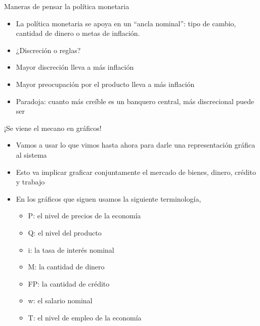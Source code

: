 \documentclass{beamer}
\begin{document}
\begin{frame}{Maneras de pensar la política monetaria}
    \begin{itemize}
        \item La política monetaria se apoya en un “ancla nominal”: tipo de cambio, cantidad de dinero o metas de inflación.
        \item ¿Discreción o reglas?
        \item Mayor discreción lleva a más inflación
        \item Mayor preocupación por el producto lleva a más inflación
            \item Paradoja: cuanto más creíble es un banquero central, más discrecional puede ser
        \end{itemize}
\end{frame}
\begin{frame}{¡Se viene el mecano en gráficos!}

\begin{itemize}
    \item Vamos a usar lo que vimos hasta ahora para darle una representación gráfica al sistema 
    \item Esto va implicar graficar conjuntamente el mercado de bienes, dinero, crédito y trabajo
    \item En los gráficos que siguen usamos la siguiente terminología, 
    \begin{itemize}
        \item P: el nivel de precios de la economía
        \item Q: el nivel del producto
        \item i: la tasa de interés nominal
        \item M: la cantidad de dinero
        \item FP: la cantidad de crédito
        \item w: el salario nominal
        \item T: el nivel de empleo de la economía
    \end{itemize}
\end{itemize}

\end{frame}
\end{document}
